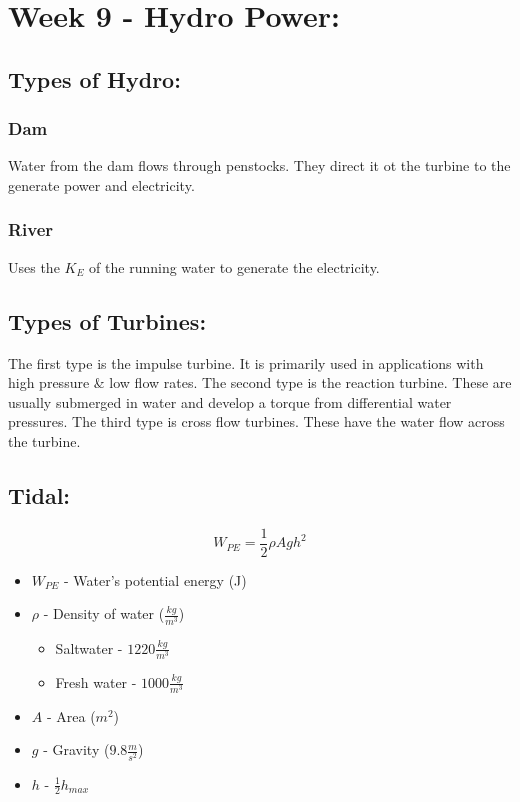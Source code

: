 \documentclass[a5paper]{report}
\begin{document}
	\section*{Week 9 - Hydro Power:}
	\subsection*{Types of Hydro:}
	\subsubsection*{Dam}
	Water from the dam flows through penstocks. They direct it ot the turbine to the generate power and electricity.
	\subsubsection*{River}
	Uses the $K_{E}$ of the running water to generate the electricity.

	\subsection*{Types of Turbines:}
	The first type is the impulse turbine. It is primarily used in applications with high pressure \& low flow rates. The second type is the reaction turbine. These are usually submerged in water and develop a torque from differential water pressures. The third type is cross flow turbines. These have the water flow across the turbine.

	\subsection*{Tidal:}
	$$W_{PE}=\frac{1}{2}\rho Agh^{2}$$
	\begin{itemize}
		\item $W_{PE}$ - Water's potential energy (J)
		\item $\rho$ - Density of water ($\frac{kg}{m^{3}}$)
		\begin{itemize}
			\item Saltwater - $1220\frac{kg}{m^{3}}$
			\item Fresh water - $1000\frac{kg}{m^{3}}$
		\end{itemize}
		\item $A$ - Area ($m^{2}$)
		\item $g$ - Gravity ($9.8\frac{m}{s^{2}}$)
		\item $h$ - $\frac{1}{2}h_{max}$
	\end{itemize}
\end{document}
